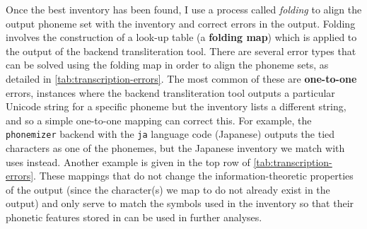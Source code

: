 Once the best inventory has been found, I use a process called \emph{folding} to align the output phoneme set with the inventory and correct errors in the output. Folding involves the construction of a look-up table (a \textbf{folding map}) which is applied to the output of the backend transliteration tool. There are several error types that can be solved using the folding map in order to align the phoneme sets, as detailed in \cref{tab:transcription-errors}. The most common of these are \textbf{one-to-one} errors, instances where the backend transliteration tool outputs a particular Unicode string for a specific phoneme but the inventory lists a different string, and so a simple one-to-one mapping can correct this. For example, the \texttt{phonemizer} backend with the \texttt{ja} language code (Japanese) outputs the tied characters  as one of the phonemes, but the Japanese inventory we match with uses  instead. Another example is given in the top row of \cref{tab:transcription-errors}. These mappings that do not change the information-theoretic properties of the output (since the character(s) we map to do not already exist in the output) and only serve to match the symbols used in the inventory so that their phonetic features stored in \phoible can be used in further analyses.

